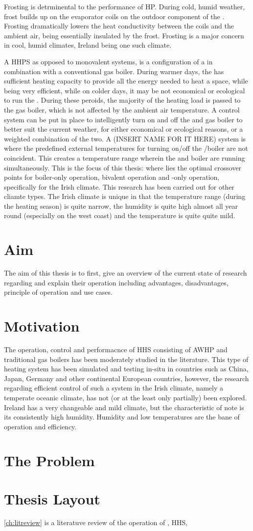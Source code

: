 Frosting is detrminental to the performance of \acs{HP}. During cold, humid weather, frost builds up on the evaporator coils on the outdoor component of the \HP. Frosting dramatically lowers the heat conductivity between the coils and the ambient air, being essentially insulated by the frost. Frosting is a major concern in cool, humid climates, Ireland being one such climate.

A \ac{HHPS} as opposed to monovalent systems, is a configuration of a \HP in combination with a conventional gas boiler. During warmer days, the \HP has sufficient heating capacity to provide all the energy needed to heat a space, while being very efficient, while on colder days, it may be not economical or ecological to run the \HP. During these peroids, the majority of the heating load is passed to the gas boiler, which is not affected by the ambient air temperature. A control system can be put in place to intelligently turn on and off the \HP and gas boiler to better suit the current weather, for either economical or ecological reasons, or a weighted combination of the two. A (INSERT NAME FOR IT HERE) system is where the predefined external temperatures for turning on/off the \HP/boiler are not coincident. This creates a temperature range wherein the \HP and boiler are running simultaneously. This is the focus of this thesis: where lies the optimal crossover points for boiler-only operation, bivalent operation and \HP-only operation, specifically for the Irish climate. This research has been carried out for other cliamte types. The Irish climate is unique in that the temperature range (during the heating season) is quite narrow, the humidity is quite high almost all year round (especially on the west coast) and the temperature is quite quite mild.  

\section{Aim}
The aim of this thesis is to first, give an overview of the current state of research regarding \HPs and explain their operation including advantages, disadvantages, principle of operation and use cases. 

\section{Motivation}
The operation, control and performacnce of \acs{HHS} consisting of \acs{AWHP} and traditional gas boilers has been moderately studied in the literature. This type of heating system has been simulated and testing in-situ in countries such as China, Japan, Germany and other continental European countries, however, the research regarding efficient control of such a system in the Irish climate, namely a temperate oceanic climate, has not (or at the least only partially) been explored. Ireland has a very changeable and mild climate, but the characteristic of note is its consistently high humidity. Humidity and low temperatures are the bane of \HP operation and efficiency.

\section{The Problem} %

\section{Thesis Layout}
\cref{ch:litreview} is a literatuve review of the operation of \HPs, \acs{HHS}, 